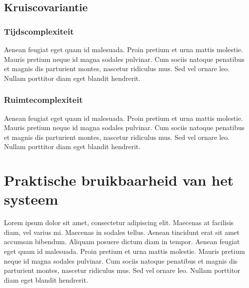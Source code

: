 \subsection{Kruiscovariantie}

\subsubsection{Tijdscomplexiteit}

Aenean feugiat eget quam id malesuada. Proin pretium et urna mattis molestie. Mauris pretium neque id magna sodales pulvinar. Cum sociis natoque penatibus et magnis dis parturient montes, nascetur ridiculus mus. Sed vel ornare leo. Nullam porttitor diam eget blandit hendrerit.

\subsubsection{Ruimtecomplexiteit}

Aenean feugiat eget quam id malesuada. Proin pretium et urna mattis molestie. Mauris pretium neque id magna sodales pulvinar. Cum sociis natoque penatibus et magnis dis parturient montes, nascetur ridiculus mus. Sed vel ornare leo. Nullam porttitor diam eget blandit hendrerit.


\section{Praktische bruikbaarheid van het systeem}

Lorem ipsum dolor sit amet, consectetur adipiscing elit. Maecenas at facilisis diam, vel varius mi. Maecenas in sodales tellus. Aenean tincidunt erat sit amet accumsan bibendum. Aliquam posuere dictum diam in tempor. Aenean feugiat eget quam id malesuada. Proin pretium et urna mattis molestie. Mauris pretium neque id magna sodales pulvinar. Cum sociis natoque penatibus et magnis dis parturient montes, nascetur ridiculus mus. Sed vel ornare leo. Nullam porttitor diam eget blandit hendrerit.
